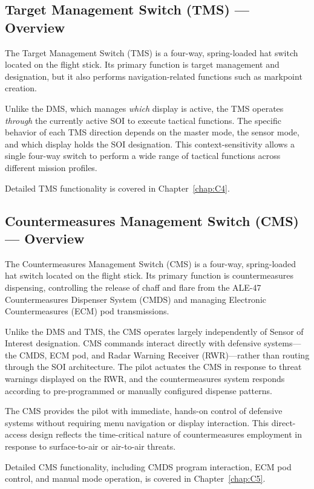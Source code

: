 \documentclass[11pt, a4paper, twoside]{report}
\begin{document}
\subsection{Target Management Switch (TMS) — Overview}
\label{sec:C2-S3-S2}

The Target Management Switch (TMS) is a four-way, spring-loaded hat switch located on the flight stick. Its primary function is target management and designation, but it also performs navigation-related functions such as markpoint creation.

Unlike the DMS, which manages \textit{which} display is active, the TMS operates \textit{through} the currently active SOI to execute tactical functions. The specific behavior of each TMS direction depends on the master mode, the sensor mode, and which display holds the SOI designation. This context-sensitivity allows a single four-way switch to perform a wide range of tactical functions across different mission profiles.

Detailed TMS functionality is covered in Chapter~\ref{chap:C4}.


\subsection{Countermeasures Management Switch (CMS) — Overview}
\label{sec:C2-S3-S3}

The Countermeasures Management Switch (CMS) is a four-way, spring-loaded hat switch located on the flight stick. Its primary function is countermeasures dispensing, controlling the release of chaff and flare from the ALE-47 Countermeasures Dispenser System (CMDS) and managing Electronic Countermeasures (ECM) pod transmissions.

Unlike the DMS and TMS, the CMS operates largely independently of Sensor of Interest designation. CMS commands interact directly with defensive systems—the CMDS, ECM pod, and Radar Warning Receiver (RWR)—rather than routing through the SOI architecture. The pilot actuates the CMS in response to threat warnings displayed on the RWR, and the countermeasures system responds according to pre-programmed or manually configured dispense patterns.

The CMS provides the pilot with immediate, hands-on control of defensive systems without requiring menu navigation or display interaction. This direct-access design reflects the time-critical nature of countermeasures employment in response to surface-to-air or air-to-air threats.

Detailed CMS functionality, including CMDS program interaction, ECM pod control, and manual mode operation, is covered in Chapter~\ref{chap:C5}.

\end{document}
